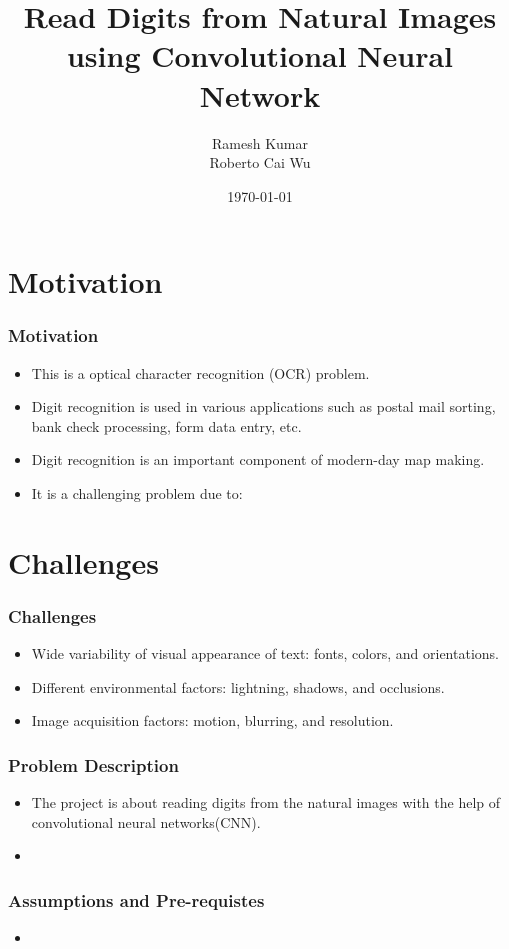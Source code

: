 \documentclass[10.5pt,aspectratio=1610,xcolor={usenames,dvipsnames,table}]{beamer}
\title{Read Digits from Natural Images using Convolutional Neural Network}
\author{Ramesh Kumar \\ Roberto Cai Wu}
\date{\today}
\begin{document}
\begin{frame}
\titlepage
\end{frame}


\section{Motivation}
\begin{frame}
	\frametitle{ Motivation}
	\begin{itemize}
		\item This is a optical character recognition (OCR) problem.
		\item Digit recognition is used in various applications such as postal mail
		sorting, bank check processing, form data entry, etc.
		\item Digit recognition is an important component of modern-day map making. \cite{Goodfellow2013}
		\item It is a challenging problem due to:  \cite{Goodfellow2013}
		
	\end{itemize}
\end{frame}
\section{Challenges}
\begin{frame}
	\frametitle{Challenges}
	\begin{itemize}
		\item Wide variability of visual appearance of text: fonts, colors, and orientations.
						\item Different environmental factors: lightning, shadows, and occlusions.
						\item Image acquisition factors: motion, blurring, and resolution. 
	
	\end{itemize}
\end{frame}
\begin{frame}
\frametitle{Problem Description}
\begin{itemize}
	\item The project is about reading digits from the natural images with the
	help of convolutional neural networks(CNN).
	\item 
\end{itemize}

\end{frame}



\begin{frame}

\frametitle{Assumptions and Pre-requistes
}
\begin{itemize}
	\item 
\end{itemize}
\end{frame}
\end{document}
